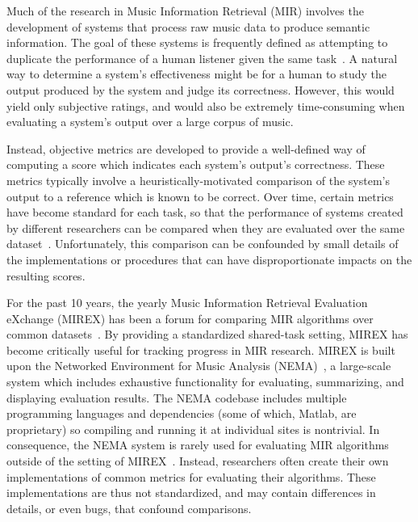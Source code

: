 Much of the research in Music Information Retrieval (MIR) involves the development of systems that process raw music data to produce semantic information.
The goal of these systems is frequently defined as attempting to duplicate the
performance of a human listener given the same task~\cite{downie2003toward}.
A natural way to determine a system's effectiveness might be for a human to study the output produced by the system and judge its correctness.
However, this would yield only subjective ratings, and would also be extremely time-consuming when evaluating a system's output over a large corpus of music.

Instead, objective metrics are developed to provide a well-defined way of computing a score which indicates each system's output's correctness.
These metrics typically involve a heuristically-motivated comparison of the system's output to a reference which is known to be correct.
Over time, certain metrics have become standard for each task, so that the performance
of systems created by different researchers can be compared when they are evaluated
over the same dataset~\cite{downie2003toward}.
Unfortunately, this comparison can be confounded by small details of the implementations or procedures that can have disproportionate impacts on the resulting scores.

For the past 10 years, the yearly Music Information Retrieval Evaluation eXchange
(MIREX) has been a forum for comparing MIR algorithms over common datasets~\cite{downie2008music}.
By providing a standardized shared-task setting, MIREX has become critically useful for tracking progress in MIR research.
MIREX is built upon the Networked Environment for Music Analysis (NEMA)~\cite{west2010networked}, a large-scale system which includes exhaustive functionality for evaluating, summarizing, and displaying evaluation results.
The NEMA codebase includes multiple programming languages and dependencies (some of which, Matlab, are proprietary) so compiling and running it at individual sites is nontrivial.
%
In consequence, the NEMA system is rarely used for evaluating MIR algorithms outside of
the setting of MIREX~\cite{downie2008music}.
Instead, researchers often create their own implementations of common metrics for evaluating their algorithms.
These implementations are thus not standardized, and may contain differences in details, or even bugs, that confound comparisons.


